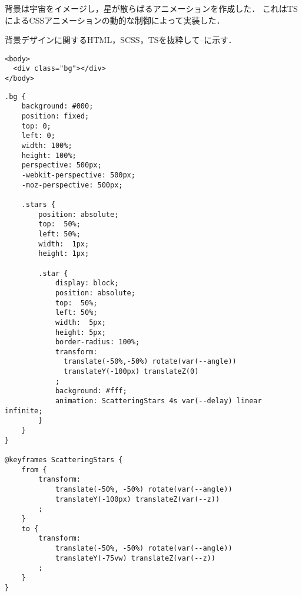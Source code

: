 \documentclass[autodetect-engine,dvi=dvipdfmx,ja=standard,
               a4j,11pt]{bxjsarticle}
\newcommand{\figref}[1]{\makebox{図~\ref{#1}}}
\begin{document}
背景は宇宙をイメージし，星が散らばるアニメーションを作成した\cite{www:10}．
これはTSによるCSSアニメーションの動的な制御によって実装した．

背景デザインに関するHTML，SCSS，TSを抜粋して\figref{prog:bg-html}--\figref{prog:bg-ts}に示す．

\begin{lstlisting}[caption={\tt index.html(背景部分抜粋)}, label={prog:bg-html}]
<body>
  <div class="bg"></div>
</body>
\end{lstlisting}


\begin{lstlisting}[caption={\tt bg.scss}, label={prog:bg-scss}]
  .bg {
    background: #000;
    position: fixed;
    top: 0;
    left: 0;
    width: 100%;
    height: 100%;
    perspective: 500px;
    -webkit-perspective: 500px;
    -moz-perspective: 500px;

    .stars {
        position: absolute;
        top:  50%;
        left: 50%;
        width:  1px;
        height: 1px;

        .star {
            display: block;
            position: absolute;
            top:  50%;
            left: 50%;
            width:  5px;
            height: 5px;
            border-radius: 100%;
            transform: 
              translate(-50%,-50%) rotate(var(--angle)) 
              translateY(-100px) translateZ(0)
            ;
            background: #fff;
            animation: ScatteringStars 4s var(--delay) linear infinite;
        }
    }
}
  
@keyframes ScatteringStars {
    from { 
        transform: 
            translate(-50%, -50%) rotate(var(--angle)) 
            translateY(-100px) translateZ(var(--z))
        ;
    }
    to {   
        transform: 
            translate(-50%, -50%) rotate(var(--angle)) 
            translateY(-75vw) translateZ(var(--z))
        ;
    }
}
\end{lstlisting}
\end{document}

